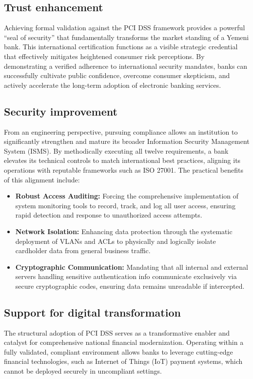 \documentclass[12pt,a4paper,oneside]{report}
\begin{document}
	\subsection{Trust enhancement}
	Achieving formal validation against the PCI DSS framework provides a powerful ``seal of security'' that fundamentally transforms the market standing of a Yemeni bank. This international certification functions as a visible strategic credential that effectively mitigates heightened consumer risk perceptions. By demonstrating a verified adherence to international security mandates, banks can successfully cultivate public confidence, overcome consumer skepticism, and actively accelerate the long-term adoption of electronic banking services.
	
	\subsection{Security improvement}
	From an engineering perspective, pursuing compliance allows an institution to significantly strengthen and mature its broader Information Security Management System (ISMS). By methodically executing all twelve requirements, a bank elevates its technical controls to match international best practices, aligning its operations with reputable frameworks such as ISO 27001. The practical benefits of this alignment include:
	\begin{itemize}
		\item \textbf{Robust Access Auditing:} Forcing the comprehensive implementation of system monitoring tools to record, track, and log all user access, ensuring rapid detection and response to unauthorized access attempts.
		\item \textbf{Network Isolation:} Enhancing data protection through the systematic deployment of VLANs and ACLs to physically and logically isolate cardholder data from general business traffic.
		\item \textbf{Cryptographic Communication:} Mandating that all internal and external servers handling sensitive authentication info communicate exclusively via secure cryptographic codes, ensuring data remains unreadable if intercepted.
	\end{itemize}
	
	\subsection{Support for digital transformation}
	The structural adoption of PCI DSS serves as a transformative enabler and catalyst for comprehensive national financial modernization. Operating within a fully validated, compliant environment allows banks to leverage cutting-edge financial technologies, such as Internet of Things (IoT) payment systems, which cannot be deployed securely in uncompliant settings. 
	
\end{document}
